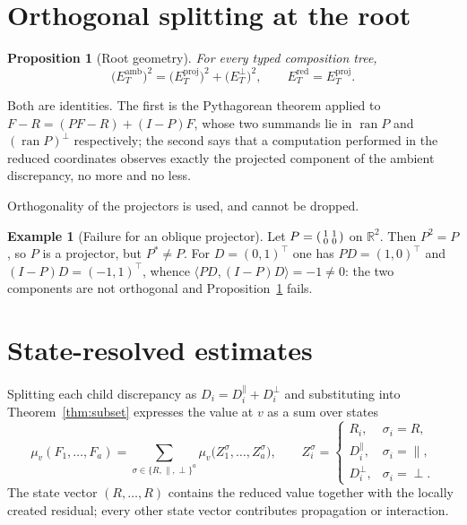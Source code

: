 \documentclass[11pt]{amsart}
\newtheorem{proposition}[theorem]{Proposition}
\theoremstyle{definition}
\newtheorem{example}[theorem]{Example}
\theoremstyle{remark}
\newcommand{\ran}{\operatorname{ran}}
\newcommand{\amb}{\mathrm{amb}}
\newcommand{\proj}{\mathrm{proj}}
\newcommand{\red}{\mathrm{red}}
\begin{document}
\section{Orthogonal splitting at the root}
\label{sec:root}

\begin{proposition}[Root geometry]
\label{prop:root}
For every typed composition tree,
\[
 \bigl(E_T^{\amb}\bigr)^2
 =\bigl(E_T^{\proj}\bigr)^2+\bigl(E_T^{\perp}\bigr)^2,
 \qquad
 E_T^{\red}=E_T^{\proj}.
\]
\end{proposition}

Both are identities. The first is the Pythagorean theorem applied to
$F-R=(PF-R)+(I-P)F$, whose two summands lie in $\ran P$ and $(\ran P)^\perp$
respectively; the second says that a computation performed in the reduced coordinates
observes exactly the projected component of the ambient discrepancy, no more and no less.

Orthogonality of the projectors is used, and cannot be dropped.

\begin{example}[Failure for an oblique projector]
\label{ex:oblique}
Let $P=\begin{psmallmatrix}1&1\\0&0\end{psmallmatrix}$ on $\mathbb R^2$. Then $P^2=P$, so
$P$ is a projector, but $P^*\ne P$. For $D=(0,1)^{\!\top}$ one has $PD=(1,0)^{\!\top}$ and
$(I-P)D=(-1,1)^{\!\top}$, whence $\langle PD,(I-P)D\rangle=-1\ne0$: the two components are
not orthogonal and Proposition~\ref{prop:root} fails.
\end{example}

\section{State-resolved estimates}
\label{sec:state}

Splitting each child discrepancy as $D_i=D_i^{\parallel}+D_i^{\perp}$ and substituting
into Theorem~\ref{thm:subset} expresses the value at $v$ as a sum over states
\[
 \mu_v(F_1,\ldots,F_a)
 =\sum_{\sigma\in\{R,\parallel,\perp\}^{a}}
 \mu_v\bigl(Z_1^{\sigma},\ldots,Z_a^{\sigma}\bigr),
 \qquad
 Z_i^{\sigma}=
 \begin{cases}
 R_i,&\sigma_i=R,\\
 D_i^{\parallel},&\sigma_i=\parallel,\\
 D_i^{\perp},&\sigma_i=\perp.
 \end{cases}
\]
The state vector $(R,\ldots,R)$ contains the reduced value together with the locally
created residual; every other state vector contributes propagation or interaction.
\end{document}
